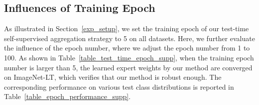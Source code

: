 \documentclass{article}
\begin{document}
\subsection{Influences of Training Epoch}
As illustrated in Section~\ref{exp_setup}, we set the training epoch of our test-time self-supervised aggregation strategy to 5   on all datasets. Here, we further evaluate the influence of the  epoch number, where we adjust the epoch number from 1 to 100. As shown in Table~\ref{table_test_time_epoch_supp}, when the training epoch number is larger than 5, the learned expert weights by our method  are converged on ImageNet-LT, which verifies that our method is robust enough. The corresponding performance on various test class distributions is reported in Table~\ref{table_epoch_performance_supp}.
 
\end{document}

